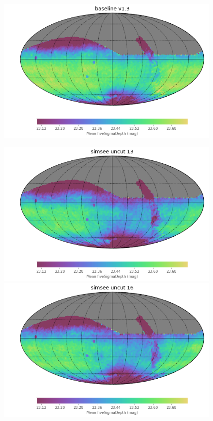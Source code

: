 \documentclass[\docopts]{\docclass}
\begin{document}
\begin{figure}
\begin{center}
  \includegraphics[width=\columnwidth]{depth_map_baseline_v1_3_10yrs.png}
\endminipage\hfill
\end{center}
  \includegraphics[width=\columnwidth]{depth_map_ss58777y13_v1_3_10yrs.png}
\endminipage\hfill
{}
  \includegraphics[width=\columnwidth]{depth_map_ss58777y16_v1_3_10yrs.png}

\end{figure}
\end{document}
